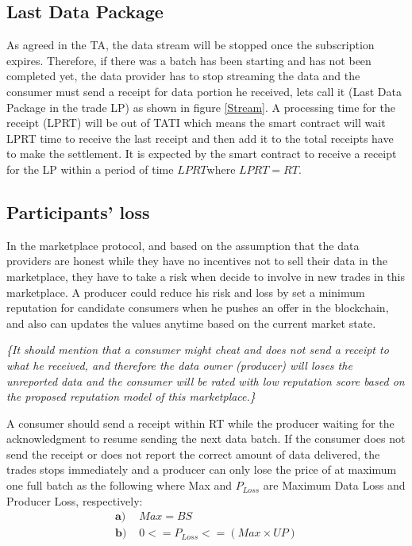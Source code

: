 \documentclass[letterpaper, 10 pt, conference]{ieeeconf}  %
\makeatletter
\newcommand{\mathleft}{\@fleqntrue\@mathmargin15pt}
\newcommand{\mynote}[1]{{\leavevmode\smaller\itshape\color{red}\{#1\}}}
\makeatother
\begin{document}
\subsection{Last Data Package}
As agreed in the TA, the data stream will be stopped once the subscription expires. Therefore, if there was a batch has been starting and has not been completed yet, the data provider has to stop streaming the data and the consumer must send a receipt for data portion he received, lets call it (Last Data Package in the trade LP) as shown in figure \ref{Stream}. A processing time for the receipt (LPRT) will be out of TATI which means the smart contract will wait LPRT time to receive the last receipt and then  add it to the total receipts have to make the settlement. It is expected by the smart contract to receive a receipt for the LP within a period of time $LPRT $where $LPRT = RT$.

\subsection{Participants' loss} \label{ParLoss}
In the marketplace protocol, and based on the assumption that the data providers are honest while they have no incentives not to sell their data in the marketplace, they have to take a risk when decide to involve in new trades in this marketplace. A producer could reduce his risk and loss by set a minimum reputation for candidate consumers when he pushes an offer in the blockchain, and also can updates the values anytime based on the current market state. 

\mynote{It should mention that a consumer might cheat and does not send a receipt to what he received, and therefore the data owner (producer) will loses the unreported data and the consumer will be rated with low reputation score based on the proposed reputation model of this marketplace.}

A consumer should send a receipt within RT while the producer waiting for the acknowledgment to resume sending the next data batch. If the consumer does not send the receipt or does not report the correct amount of data delivered, the trades stops immediately and a producer can only lose the price of at maximum one full batch as the following where Max and $ P_{Loss} $ are Maximum Data Loss and Producer Loss, respectively:
\vspace{-0.1 cm}
\mathleft
\begin{align}
\textbf{a) } & Max = BS \nonumber\\
\textbf{b) }  & 0 <= P_{Loss} <= ( Max \times UP )\nonumber
\end{align}
\end{document}
